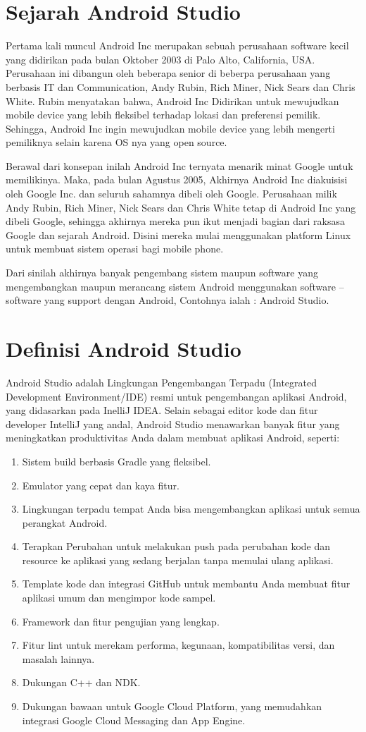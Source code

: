\section{Sejarah Android Studio}
	Pertama kali muncul Android Inc merupakan sebuah perusahaan software kecil yang didirikan pada bulan Oktober 2003 di Palo Alto, California, USA. Perusahaan ini dibangun oleh beberapa senior di beberpa perusahaan yang berbasis IT dan Communication, Andy Rubin, Rich Miner, Nick Sears dan Chris White.
Rubin menyatakan bahwa, Android Inc Didirikan untuk mewujudkan mobile device yang lebih fleksibel terhadap lokasi dan preferensi pemilik. Sehingga, Android Inc ingin mewujudkan mobile device yang lebih mengerti pemiliknya selain karena OS nya yang open source.

Berawal dari konsepan inilah Android Inc ternyata menarik minat Google untuk memilikinya. Maka, pada bulan Agustus 2005, Akhirnya Android Inc diakuisisi oleh Google Inc. dan seluruh sahamnya dibeli oleh Google.
Perusahaan milik Andy Rubin, Rich Miner, Nick Sears dan Chris White tetap di Android Inc yang dibeli Google, sehingga akhirnya mereka pun ikut  menjadi bagian dari raksasa Google dan sejarah Android. Disini mereka mulai menggunakan platform Linux untuk membuat sistem operasi bagi mobile phone.

Dari sinilah akhirnya banyak pengembang sistem maupun software yang mengembangkan maupun merancang sistem Android menggunakan software – software yang support dengan Android, Contohnya ialah : Android Studio.
\section{Definisi Android Studio}
Android Studio adalah Lingkungan Pengembangan Terpadu (Integrated Development Environment/IDE) resmi untuk pengembangan aplikasi Android, yang didasarkan pada InelliJ IDEA. Selain sebagai editor kode dan fitur developer IntelliJ yang andal, Android Studio menawarkan banyak fitur yang meningkatkan produktivitas Anda dalam membuat aplikasi Android, seperti: 
\begin{enumerate}
\item Sistem build berbasis Gradle yang fleksibel.
\item Emulator yang cepat dan kaya fitur.
\item Lingkungan terpadu tempat Anda bisa mengembangkan aplikasi untuk semua perangkat Android.
\item Terapkan Perubahan untuk melakukan push pada perubahan kode dan resource ke aplikasi yang sedang berjalan tanpa memulai ulang aplikasi.
\item Template kode dan integrasi GitHub untuk membantu Anda membuat fitur aplikasi umum dan mengimpor kode sampel.
\item Framework dan fitur pengujian yang lengkap.
\item Fitur lint untuk merekam performa, kegunaan, kompatibilitas versi, dan masalah lainnya.
\item Dukungan C++ dan NDK.
\item Dukungan bawaan untuk Google Cloud Platform, yang memudahkan integrasi Google Cloud Messaging dan App Engine.
\end{enumerate}

